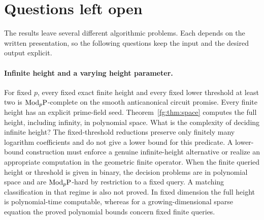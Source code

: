 \section{Questions left open}
The results leave several different algorithmic problems. Each depends on
the written presentation, so the following questions keep the input and
the desired output explicit.

\paragraph{Infinite height and a varying height parameter.}
For fixed $p$, every fixed exact finite height and every fixed lower
threshold at least two is $\mathrm{Mod}_p\mathrm P$-complete on the smooth anticanonical
circuit promise. Every finite height has an explicit prime-field seed.
Theorem~\ref{fg:thm:space} computes the full height, including infinity,
in polynomial space. What is the complexity of deciding infinite
height? The fixed-threshold reductions preserve only finitely many
logarithm coefficients and do not give a lower bound for this predicate.
A lower-bound construction must enforce a genuine infinite-height
alternative or realize an appropriate computation in the geometric
finite operator. When the finite queried height or threshold is given
in binary, the decision problems are in polynomial space and are
$\mathrm{Mod}_p\mathrm P$-hard by restriction to a fixed query. A matching classification
in that regime is also not proved. In fixed dimension the full height
is polynomial-time computable, whereas for a growing-dimensional sparse
equation the proved polynomial bounds concern fixed finite queries.

